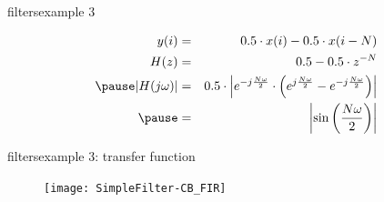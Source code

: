 	\begin{frame}{filters}{example 3}
       \begin{figure}[!hbt]
			\begin{center}
                
			\end{center}
        \end{figure}
		\pause      
    	\begin{eqnarray*}
    		y(i) &=& 0.5\cdot x(i) - 0.5\cdot x(i-N)\\
    		H(z) &=& 0.5  - 0.5\cdot z^{-N}\\
			\pause
    		|H(j\omega)| &=& 0.5\cdot\left| e^{-j\frac{N\omega}{2}} \cdot \left(e^{j\frac{N\omega}{2}} - e^{-j\frac{N\omega}{2}} \right) \right|\\
			\pause
    		 &=& \left| \sin\left(\frac{N\omega}{2}\right) \right|
    	\end{eqnarray*}
	\end{frame}	
	
	\begin{frame}{filters}{example 3: transfer function}
		\begin{figure}
			\centerline{\texttt{[image: SimpleFilter-CB\_FIR]}}
		\end{figure}
	\end{frame}	
	
